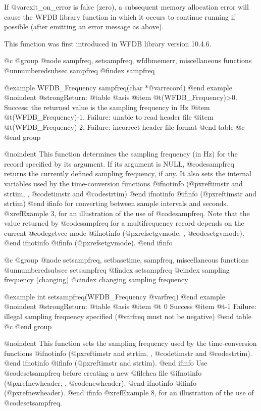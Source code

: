 {{{{{{{{If @var{exit_on_error} is false (zero), a subsequent memory allocation error
will cause the WFDB library function in which it occurs to continue running
if possible (after emitting an error message as above).

This function was first introduced in WFDB library version 10.4.6.

@c @group
@node     sampfreq, setsampfreq, wfdbmemerr, miscellaneous functions
@unnumberedsubsec sampfreq
@findex sampfreq

@example
WFDB_Frequency sampfreq(char *@var{record})
@end example
@noindent
@strong{Return:}
@table @asis
@item @t{(WFDB_Frequency)>0.}
Success: the returned value is the sampling frequency in Hz
@item @t{(WFDB_Frequency)-1.}
Failure: unable to read header file
@item @t{(WFDB_Frequency)-2.}
Failure: incorrect header file format
@end table
@c @end group

@noindent
This function determines the sampling frequency (in Hz) for the record
specified by its argument.  If its argument is NULL, @code{sampfreq}
returns the currently defined sampling frequency, if any.  It also sets
the internal variables used by the time-conversion functions
@ifnotinfo
(@pxref{timstr and strtim, , @code{timstr} and @code{strtim}})
@end ifnotinfo
@ifinfo
(@pxref{timstr and strtim})
@end ifinfo
for converting between sample intervals and seconds.  @xref{Example 3},
for an illustration of the use of @code{sampfreq}.  Note that the value
returned by @code{sampfreq} for a multifrequency record depends on the
current @code{getvec} mode
@ifnotinfo
(@pxref{setgvmode, , @code{setgvmode}}).
@end ifnotinfo
@ifinfo
(@pxref{setgvmode}).
@end ifinfo

@c @group
@node     setsampfreq, setbasetime, sampfreq, miscellaneous functions
@unnumberedsubsec setsampfreq
@findex setsampfreq
@cindex sampling frequency (changing)
@cindex changing sampling frequency

@example
int setsampfreq(WFDB_Frequency @var{freq})
@end example
@noindent
@strong{Return:}
@table @asis
@item @t{ 0}
Success
@item @t{-1}
Failure:  illegal sampling frequency specified (@var{freq} must not be
negative)
@end table
@c @end group

@noindent
This function sets the sampling frequency used by the time-conversion
functions
@ifnotinfo
(@pxref{timstr and strtim, , @code{timstr} and @code{strtim}}).
@end ifnotinfo
@ifinfo
(@pxref{timstr and strtim}).
@end ifinfo
Use @code{setsampfreq} before creating a new @file{hea} file
@ifnotinfo
(@pxref{newheader, , @code{newheader}}).
@end ifnotinfo
@ifinfo
(@pxref{newheader}).
@end ifinfo
@xref{Example 8}, for an illustration of the use of @code{setsampfreq}.

}}}}}}}}
